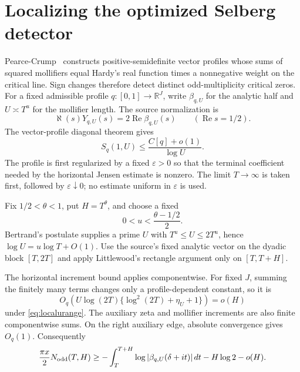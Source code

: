﻿\documentclass[11pt]{article}
\theoremstyle{remark}
\begin{document}
\section{Localizing the optimized Selberg detector}
\label{sec:localselberg}

Pearce-Crump~\cite{PearceCrump} constructs positive-semidefinite vector
profiles whose sums of squared mollifiers equal Hardy's real function times a
nonnegative weight on the critical line. Sign changes therefore detect
distinct odd-multiplicity critical zeros. For a fixed admissible profile
$q:[0,1]\to\mathbb R^J$, write $\beta_{q,U}$ for the analytic half and
$U\asymp T^u$ for the mollifier length. The source normalization is
\begin{equation}\label{eq:selbergnormalization}
 \aleph(s)Y_{q,U}(s)=2\operatorname{Re}\beta_{q,U}(s)
 \qquad (\operatorname{Re}s=1/2).
\end{equation}
The vector-profile diagonal theorem gives
\begin{equation}\label{eq:c3diagonal}
 S_q(1,U)\le\frac{C[q]+o(1)}{\log U}.
\end{equation}
The profile is first regularized by a fixed $\varepsilon>0$ so that the
terminal coefficient needed by the horizontal Jensen estimate is nonzero.
The limit $T\to\infty$ is taken first, followed by
$\varepsilon\downarrow0$; no estimate uniform in $\varepsilon$ is used.

Fix $1/2<\theta<1$, put $H=T^\theta$, and choose a fixed
\begin{equation}\label{eq:localurange}
 0<u<\frac{\theta-1/2}{2}.
\end{equation}
Bertrand's postulate supplies a prime $U$ with
$T^u\le U\le2T^u$, hence $\log U=u\log T+O(1)$. Use the source's fixed
analytic vector on the dyadic block $[T,2T]$ and apply Littlewood's rectangle
argument only on $[T,T+H]$.

The horizontal increment bound applies componentwise. For fixed $J$, summing
the finitely many terms changes only a profile-dependent constant, so it is
\[
 O_q\!\left(U\log(2T)\{\log^2(2T)+\eta_U+1\}\right)=o(H)
\]
under \eqref{eq:localurange}. The auxiliary zeta and mollifier increments are
also finite componentwise sums. On the right auxiliary edge, absolute
convergence gives $O_q(1)$. Consequently
\begin{equation}\label{eq:shortrectangle}
 \frac{\pi x}{2}N_{\rm odd}(T,H)
 \ge-\int_T^{T+H}\log|\beta_{q,U}(\delta+it)|\,dt
       -H\log2-o(H).
\end{equation}
\end{document}
